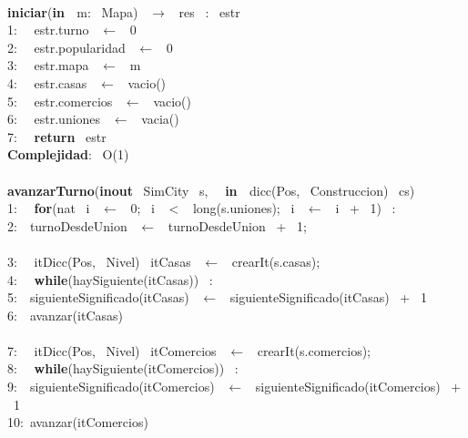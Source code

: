 \begin{Algoritmos} \\
    \makebox[\linewidth]{\rule{\textwidth}{0.4pt}}
    \textbf{iniciar}(\textbf{in \ }m: \ Mapa) \ $\longrightarrow$ \ res \ : \ estr\\
    1: \  \ estr.turno \ $\leftarrow$ \ 0\\
    2: \  \ estr.popularidad \ $\leftarrow$ \ 0\\
    3: \  \ estr.mapa \ $\leftarrow$ \ m\\
    4: \  \ estr.casas \ $\leftarrow$ \ vacio()\\
    5: \  \ estr.comercios \ $\leftarrow$ \ vacio()\\
    6: \  \ estr.uniones \ $\leftarrow$ \ vacia()\\
    7: \  \ \textbf{return} \ estr\\
    \textbf{Complejidad}: \ O(1)\\
    \noindent\makebox[\linewidth]{\rule{\textwidth}{0.4pt}}
    \\
    \noindent\makebox[\linewidth]{\rule{\textwidth}{0.4pt}}
    \textbf{avanzarTurno}(\textbf{inout} \ SimCity \ s, \  \ \textbf{in \ }dicc(Pos, \ Construccion) \ cs)\\
    1: \  \ \textbf{for}(nat \ i \ $\leftarrow$ \ 0; \ i \ $<$ \ long(s.uniones); \ i \ $\leftarrow$ \ i \ + \ 1) \ : \ \\
    2:\indent  \  \ turnoDesdeUnion \ $\leftarrow$ \ turnoDesdeUnion \ + \ 1;\\
    \indent \\
    3: \  \ itDicc(Pos, \ Nivel) \ itCasas \ $\leftarrow$ \ crearIt(s.casas);\\
    4: \  \ \textbf{while}(haySiguiente(itCasas)) \ :\\
    5:\indent  \  \ siguienteSignificado(itCasas) \ $\leftarrow$ \ siguienteSignificado(itCasas) \ + \ 1\\
    6:\indent  \  \ avanzar(itCasas)\\
    \indent \\
    7: \  \ itDicc(Pos, \ Nivel) \ itComercios \ $\leftarrow$ \ crearIt(s.comercios);\\
    8: \  \ \textbf{while}(haySiguiente(itComercios)) \ :\\
    9:\indent  \  \ siguienteSignificado(itComercios) \ $\leftarrow$ \ siguienteSignificado(itComercios) \ + \ 1\\
    10:\indent  \ avanzar(itComercios)\\
     \  \  \ \\

\end{Algoritmos}
